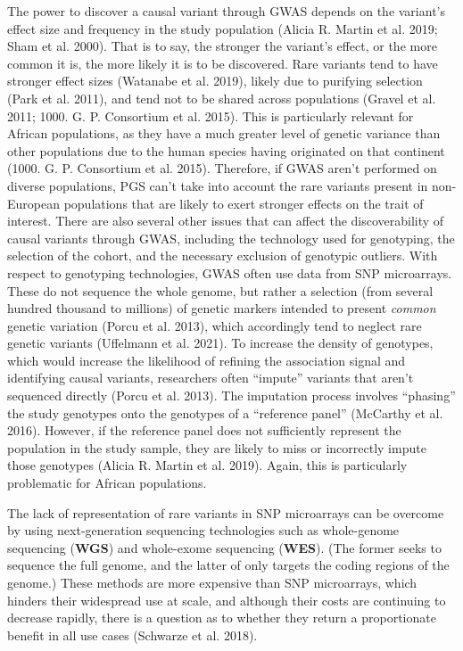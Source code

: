 \documentclass[
]{book}
\begin{document}
The power to discover a causal variant through GWAS depends on the variant's effect size and frequency in the study population (Alicia R. Martin et al. 2019; Sham et al. 2000). That is to say, the stronger the variant's effect, or the more common it is, the more likely it is to be discovered. Rare variants tend to have stronger effect sizes (Watanabe et al. 2019), likely due to purifying selection (Park et al. 2011), and tend not to be shared across populations (Gravel et al. 2011; 1000. G. P. Consortium et al. 2015). This is particularly relevant for African populations, as they have a much greater level of genetic variance than other populations due to the human species having originated on that continent (1000. G. P. Consortium et al. 2015). Therefore, if GWAS aren't performed on diverse populations, PGS can't take into account the rare variants present in non-European populations that are likely to exert stronger effects on the trait of interest. There are also several other issues that can affect the discoverability of causal variants through GWAS, including the technology used for genotyping, the selection of the cohort, and the necessary exclusion of genotypic outliers.
With respect to genotyping technologies, GWAS often use data from SNP microarrays. These do not sequence the whole genome, but rather a selection (from several hundred thousand to millions) of genetic markers intended to present \emph{common} genetic variation (Porcu et al. 2013), which accordingly tend to neglect rare genetic variants (Uffelmann et al. 2021). To increase the density of genotypes, which would increase the likelihood of refining the association signal and identifying causal variants, researchers often ``impute'' variants that aren't sequenced directly (Porcu et al. 2013). The imputation process involves ``phasing'' the study genotypes onto the genotypes of a ``reference panel'' (McCarthy et al. 2016). However, if the reference panel does not sufficiently represent the population in the study sample, they are likely to miss or incorrectly impute those genotypes (Alicia R. Martin et al. 2019). Again, this is particularly problematic for African populations.

The lack of representation of rare variants in SNP microarrays can be overcome by using next-generation sequencing technologies such as whole-genome sequencing (\textbf{WGS}) and whole-exome sequencing (\textbf{WES}). (The former seeks to sequence the full genome, and the latter of only targets the coding regions of the genome.) These methods are more expensive than SNP microarrays, which hinders their widespread use at scale, and although their costs are continuing to decrease rapidly, there is a question as to whether they return a proportionate benefit in all use cases (Schwarze et al. 2018).
\end{document}
